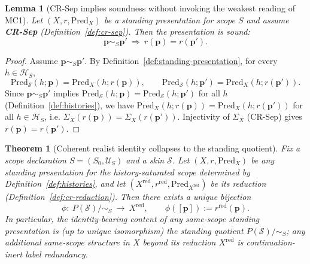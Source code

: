 \documentclass[11pt]{article}
\newtheorem{theorem}[definition]{Theorem}
\newtheorem{lemma}[definition]{Lemma}
\theoremstyle{remark}
\newcommand{\Skin}{\mathcal{S}}
\begin{document}
\begin{lemma}[CR-Sep implies soundness without invoking the weakest reading of MC1]\label{lem:cr-sound}
Let $(X,r,\mathrm{Pred}_X)$ be a standing presentation for scope $S$ and assume \textbf{CR-Sep}
(Definition~\ref{def:cr-sep}).
Then the presentation is sound:
\[
\mathbf{p}\sim_S\mathbf{p}'\ \Longrightarrow\ r(\mathbf{p})=r(\mathbf{p}').
\]
\end{lemma}

\begin{proof}
Assume $\mathbf{p}\sim_S\mathbf{p}'$.
By Definition~\ref{def:standing-presentation}, for every $h\in\mathcal{H}_S$,
\[
\mathrm{Pred}_{\Skin}(h;\mathbf{p})
=\mathrm{Pred}_X(h;r(\mathbf{p})),\qquad
\mathrm{Pred}_{\Skin}(h;\mathbf{p}')
=\mathrm{Pred}_X(h;r(\mathbf{p}')).
\]
Since $\mathbf{p}\sim_S\mathbf{p}'$ implies $\mathrm{Pred}_{\Skin}(h;\mathbf{p})=\mathrm{Pred}_{\Skin}(h;\mathbf{p}')$
for all $h$ (Definition~\ref{def:histories}), we have
$\mathrm{Pred}_X(h;r(\mathbf{p}))=\mathrm{Pred}_X(h;r(\mathbf{p}'))$ for all $h\in\mathcal{H}_S$, i.e.
$\Sigma_X(r(\mathbf{p}))=\Sigma_X(r(\mathbf{p}'))$.
Injectivity of $\Sigma_X$ (CR-Sep) gives $r(\mathbf{p})=r(\mathbf{p}')$.
\end{proof}

\begin{theorem}[Coherent realist identity collapses to the standing quotient]\label{thm:realist-collapse}
Fix a scope declaration $S=(S_0,\mathcal{U}_S)$ and a skin $\Skin$.
Let $(X,r,\mathrm{Pred}_X)$ be any standing presentation for the history-saturated scope determined by
Definition~\ref{def:histories}, and let $(X^{\mathrm{red}},r^{\mathrm{red}},\mathrm{Pred}_{X^{\mathrm{red}}})$
be its reduction (Definition~\ref{def:cr-reduction}).
Then there exists a unique bijection
\[
\phi:\ P(\Skin)/\!\sim_S\ \longrightarrow\ X^{\mathrm{red}},\qquad \phi([\mathbf{p}]):=r^{\mathrm{red}}(\mathbf{p}).
\]
In particular, the identity-bearing content of any same-scope standing presentation is (up to unique isomorphism)
the standing quotient $P(\Skin)/\!\sim_S$; any additional same-scope structure in $X$ beyond its reduction
$X^{\mathrm{red}}$ is continuation-inert label redundancy.
\end{theorem}
\end{document}
